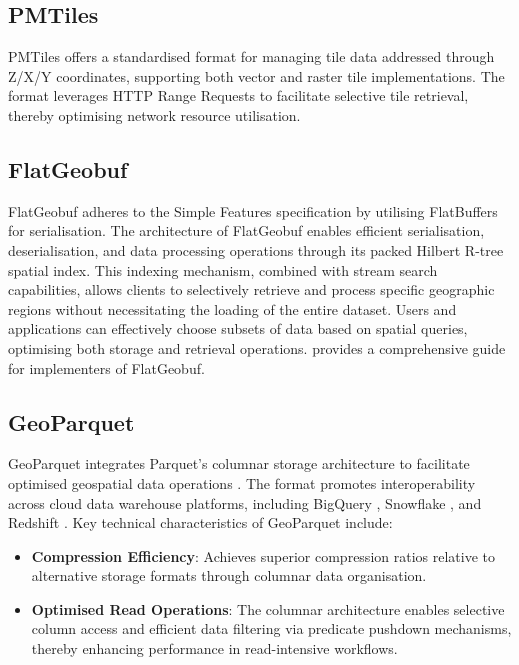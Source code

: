 \subsection{PMTiles}
\label{rw:cloud_optimised_implementations:pmtiles}
PMTiles offers a standardised format for managing tile data addressed through Z/X/Y coordinates, supporting both vector and raster tile implementations. The format leverages HTTP Range Requests \citep{http_range_requests} to facilitate selective tile retrieval, thereby optimising network resource utilisation.

\subsection{FlatGeobuf}
\label{rw:cloud_optimised_implementations:flatgeobuf}
FlatGeobuf adheres to the Simple Features \citet{simple_features} specification by utilising FlatBuffers \citep{flatbuffers} for serialisation.
The architecture of FlatGeobuf enables efficient serialisation, deserialisation, and data processing operations through its packed Hilbert R-tree spatial index.
This indexing mechanism, combined with stream search capabilities, allows clients to selectively retrieve and process specific geographic regions without necessitating the loading of the entire dataset.
Users and applications can effectively choose subsets of data based on spatial queries, optimising both storage and retrieval operations.
\citet{horance_2022_detail} provides a comprehensive guide for implementers of FlatGeobuf.

\subsection{GeoParquet}
\label{rw:cloud_optimised_implementations:geoparquet}
GeoParquet integrates Parquet's columnar storage architecture to facilitate optimised geospatial data operations \citep{geoparquet}. The format promotes interoperability across cloud data warehouse platforms, including BigQuery \citep{bigquery}, Snowflake \citep{snowflake}, and Redshift \citep{redshift}. Key technical characteristics of GeoParquet include:

\begin{itemize}
  \item \textbf{Compression Efficiency}: Achieves superior compression ratios relative to alternative storage formats through columnar data organisation.
  \item \textbf{Optimised Read Operations}: The columnar architecture enables selective column access and efficient data filtering via predicate pushdown mechanisms, thereby enhancing performance in read-intensive workflows.
\end{itemize}

